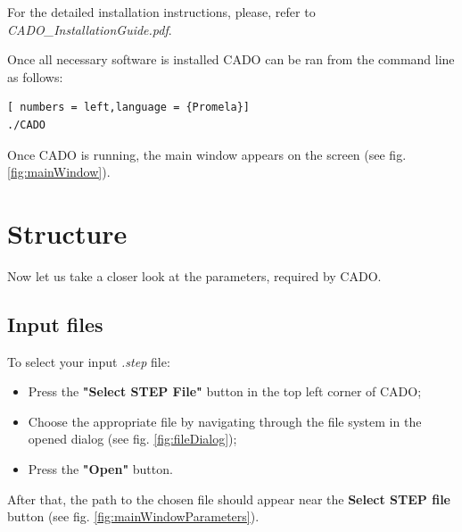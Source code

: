 \documentclass[
12pt, %
a4paper, %
oneside, %
headinclude,footinclude, %
BCOR5mm, %
]{scrartcl}
\begin{document}
For the detailed installation instructions, please, refer to \\ \textit{CADO\_InstallationGuide.pdf}.

Once all necessary software is installed CADO can be ran from the command line as follows:
\begin{lstlisting}[ numbers = left,language = {Promela}]
./CADO
\end{lstlisting}

Once CADO is running, the main window appears on the screen (see fig. \ref{fig:mainWindow}).



\section{Structure}
\label{sec:structure}
Now let us take a closer look at the parameters, required by CADO.

\subsection{Input files}
To select your input \textit{.step} file:
\begin{itemize}
\item Press the \textbf{"Select STEP File"} button in the top left corner of CADO;
\item Choose the appropriate file by navigating through the file system in the opened dialog (see fig. \ref{fig:fileDialog});
\item Press the \textbf{"Open"} button.
\end{itemize}

After that, the path to the chosen file should appear near the \textbf{Select STEP file} button (see fig. \ref{fig:mainWindowParameters}).
\end{document}
